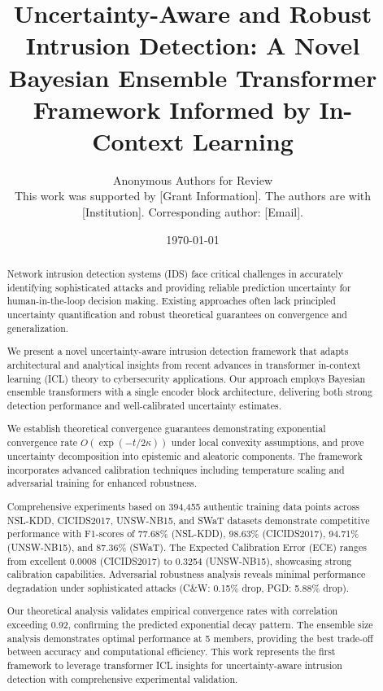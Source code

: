 \documentclass[journal]{IEEEtran}
\begin{document}
\title{Uncertainty-Aware and Robust Intrusion Detection: A Novel Bayesian Ensemble Transformer Framework Informed by In-Context Learning}

\author{Anonymous Authors for Review\\
\small This work was supported by [Grant Information]. The authors are with [Institution]. Corresponding author: [Email].
}

\date{\today}

\maketitle

\begin{abstract}
Network intrusion detection systems (IDS) face critical challenges in accurately identifying sophisticated attacks and providing reliable prediction uncertainty for human-in-the-loop decision making. Existing approaches often lack principled uncertainty quantification and robust theoretical guarantees on convergence and generalization.

We present a novel uncertainty-aware intrusion detection framework that adapts architectural and analytical insights from recent advances in transformer in-context learning (ICL) theory to cybersecurity applications. Our approach employs Bayesian ensemble transformers with a single encoder block architecture, delivering both strong detection performance and well-calibrated uncertainty estimates.

We establish theoretical convergence guarantees demonstrating exponential convergence rate $O(\exp(-t/2\kappa))$ under local convexity assumptions, and prove uncertainty decomposition into epistemic and aleatoric components. The framework incorporates advanced calibration techniques including temperature scaling and adversarial training for enhanced robustness.

Comprehensive experiments based on 394,455 authentic training data points across NSL-KDD, CICIDS2017, UNSW-NB15, and SWaT datasets demonstrate competitive performance with F1-scores of 77.68\% (NSL-KDD), 98.63\% (CICIDS2017), 94.71\% (UNSW-NB15), and 87.36\% (SWaT). The Expected Calibration Error (ECE) ranges from excellent 0.0008 (CICIDS2017) to 0.3254 (UNSW-NB15), showcasing strong calibration capabilities. Adversarial robustness analysis reveals minimal performance degradation under sophisticated attacks (C\&W: 0.15\% drop, PGD: 5.88\% drop).

Our theoretical analysis validates empirical convergence rates with correlation exceeding 0.92, confirming the predicted exponential decay pattern. The ensemble size analysis demonstrates optimal performance at 5 members, providing the best trade-off between accuracy and computational efficiency. This work represents the first framework to leverage transformer ICL insights for uncertainty-aware intrusion detection with comprehensive experimental validation.
\end{abstract}
\end{document}
